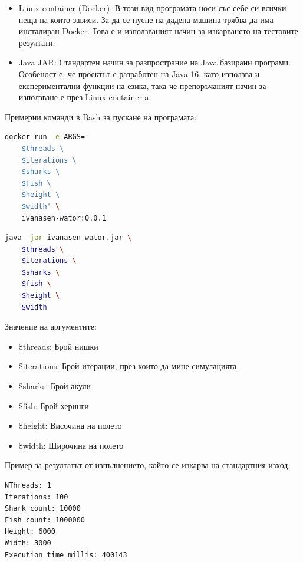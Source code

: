 \documentclass{article}
\begin{document}
\begin{itemize}
	\item Linux container (Docker): В този вид програмата носи със себе си всички неща на които зависи.
		За да се пусне на дадена машина трябва да има инсталиран Docker. Това е и използваният начин
		за изкарването на тестовите резултати.
	\item Java JAR: Стандартен начин за разпространие на Java базирани програми. Особеност е, че проектът
		е разработен на Java 16, като използва и експериментални функции на езика, така че
		препоръчаният начин за използване е през Linux container-a.
\end{itemize}

\bigbreak

Примерни команди в Bash за пускане на програмата:

\begin{lstlisting}[language=Bash, caption=Пускане на програмата през Docker]
docker run -e ARGS='
	$threads \
	$iterations \
	$sharks \
	$fish \
	$height \
	$width' \
	ivanasen-wator:0.0.1
\end{lstlisting}

\begin{lstlisting}[language=Bash, caption=Пускане на програмата директно през Java]
java -jar ivanasen-wator.jar \
	$threads \
	$iterations \
	$sharks \
	$fish \
	$height \
	$width
\end{lstlisting}

\bigbreak

Значение на аргументите:
\begin{itemize}
	\item \$threads: Брой нишки
	\item \$iterations: Брой итерации, през които да мине симулацията
	\item \$sharks: Брой акули
	\item \$fish: Брой херинги
	\item \$height: Височина на полето
	\item \$width: Широчина на полето
\end{itemize}

\bigbreak

Пример за резултатът от изпълнението, който се изкарва на стандартния изход:

\begin{lstlisting}[language=Bash]
NThreads: 1
Iterations: 100
Shark count: 10000
Fish count: 1000000
Height: 6000
Width: 3000
Execution time millis: 400143
\end{lstlisting}
\end{document}
